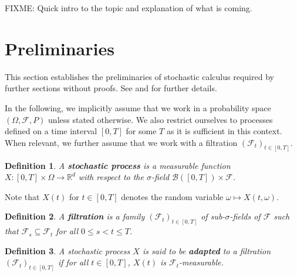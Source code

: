 \documentclass[a4paper]{article}
\newtheorem{definition}{Definition}[section]
\begin{document}
FIXME: Quick intro to the topic and explanation of what is coming.

\section{Preliminaries}


This section establishes the preliminaries of stochastic calculus required by further sections without proofs. See \textcite{capinski_stochastic_2012} and \textcite{capinski_blackscholes_2012} for further details.

In the following, we implicitly assume that we work in a probability space $(\Omega, \mathcal{F}, P)$ unless stated otherwise. We also restrict ourselves to processes defined on a time interval $[0,T]$ for some $T$ as it is sufficient in this context. When relevant, we further assume that we work with a filtration $(\mathcal{F}_t)_{t \in [0,T]}$.

\begin{definition}
  A \textbf{stochastic process} is a measurable function $X : [0,T] \times \Omega \to \mathbb{R}^d$ with respect to the $\sigma$-field $\mathcal{B}([0,T]) \times \mathcal{F}$.
\end{definition}

Note that $X(t)$ for $t \in [0,T]$ denotes the random variable $\omega \mapsto X(t,\omega)$.

\begin{definition}
  A \textbf{filtration} is a family $(\mathcal{F}_t)_{t \in [0,T]}$ of sub-$\sigma$-fields of $\mathcal{F}$ such that $\mathcal{F}_s \subseteq \mathcal{F}_t$ for all $0 \le s < t \le T$.
\end{definition}

\begin{definition}
  A stochastic process $X$ is said to be \textbf{adapted} to a filtration $(\mathcal{F}_t)_{t \in [0,T]}$ if for all $t \in [0,T]$, $X(t)$ is $\mathcal{F}_t$-measurable.
\end{definition}
\end{document}
